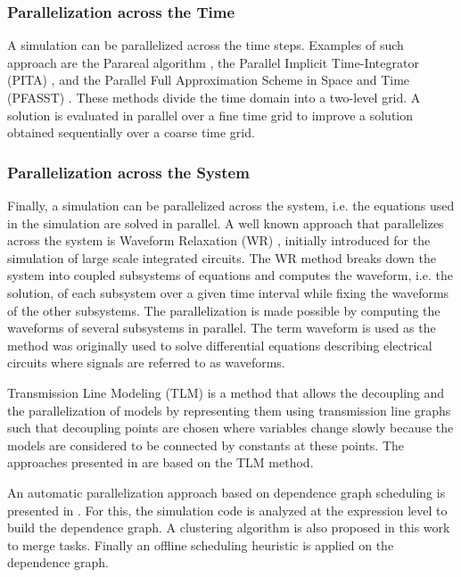 \subsubsection{Parallelization across the Time}

A simulation can be parallelized across the time steps. Examples of such approach are the Parareal algorithm \cite{lions:2001}, the Parallel Implicit Time-Integrator (PITA) \cite{farhat:2003}, and the Parallel Full Approximation Scheme in Space and Time (PFASST) \cite{emmett:2012}. These methods divide the time domain into a two-level grid. A solution is evaluated in parallel over a fine time grid to improve a solution obtained sequentially over a coarse time grid.
\subsubsection{Parallelization across the System}

Finally, a simulation can be parallelized across the system, i.e. the equations used in the simulation are solved in parallel. A well known approach that parallelizes across the system is Waveform Relaxation (WR) \cite{lelarasmee:1982}, initially introduced for the simulation of large scale integrated circuits. The WR method breaks down the system into coupled subsystems of equations and computes the waveform, i.e. the solution, of each subsystem over a given time interval while fixing the waveforms of the other subsystems. The parallelization is made possible by computing the waveforms of several subsystems in parallel. The term waveform is used as the method was originally used to solve differential equations describing electrical circuits where signals are referred to as waveforms. 

Transmission Line Modeling (TLM) \cite{hui:1990} is a method that allows the decoupling and the parallelization of models by representing them using transmission line graphs such that decoupling points are chosen where variables change slowly because the models are considered to be connected by constants at these points. The approaches presented in \cite{sjolund:2010,braun:2012} are based on the TLM method. 

An automatic parallelization approach based on dependence graph scheduling is presented in \cite{aronsson:2006}. For this, the simulation code is analyzed at the expression level to build the dependence graph. A clustering algorithm is also proposed in this work to merge tasks. Finally an offline scheduling heuristic is applied on the dependence graph.

